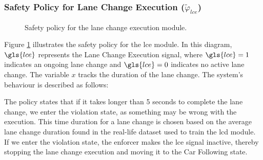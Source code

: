 \subsubsection{Safety Policy for Lane Change 
Execution ($\tilde{\varphi}_{lce}$)}
\label{sec:lce_policy}
\begin{figure}[htbp]
    
\caption{Safety policy for the lane change execution module.}
\label{fig:lce_policy}
 \end{figure}
Figure \ref{fig:lce_policy} illustrates the safety policy for the \gls{lce} module. In this diagram, $\gls{lce}$ represents the Lane Change Execution signal, where $\gls{lce}=1$ indicates an ongoing lane change and $\gls{lce}=0$ indicates no active lane change. The variable $x$ tracks the duration of the lane change. The system's behaviour is described as follows: 



 

The policy states that if it takes longer than 5 seconds to complete the lane change, we enter the violation state, as something may be wrong with the execution. This time duration for a lane change is chosen based on the average lane change duration found in the real-life dataset used to train the \gls{lcd} module. If we enter the violation state, the enforcer makes the \gls{lce} signal inactive, thereby stopping the lane change execution and moving it to the Car Following state.




